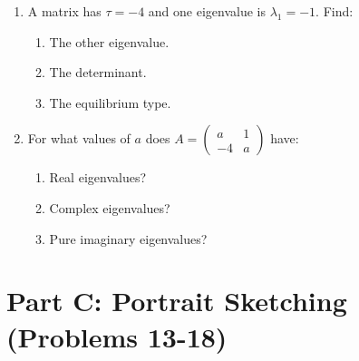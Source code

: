 \documentclass[12pt]{article}
\begin{document}
\begin{enumerate}[resume]
\item A matrix has $\tau = -4$ and one eigenvalue is $\lambda_{1} = -1$. Find:
\begin{enumerate}[label=(\alph*)]
    \item The other eigenvalue.
    \item The determinant.
    \item The equilibrium type.
\end{enumerate}

\item For what values of $a$ does $A = \begin{pmatrix} a & 1 \\ -4 & a \end{pmatrix}$ have:
\begin{enumerate}[label=(\alph*)]
    \item Real eigenvalues?
    \item Complex eigenvalues?
    \item Pure imaginary eigenvalues?
\end{enumerate}
\end{enumerate}

\section*{Part C: Portrait Sketching (Problems 13-18)}
\end{document}
